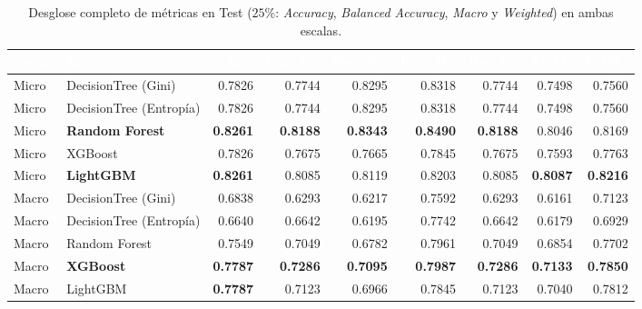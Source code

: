\documentclass[11pt,a4paper]{article}
\begin{document}
\begin{table}[H]
    \centering
    \caption{Desglose completo de métricas en Test ($25\%$: \textit{Accuracy}, \textit{Balanced Accuracy}, \textit{Macro} y \textit{Weighted}) en ambas escalas.}
    \label{tab:detallada_global}
    \setlength{\tabcolsep}{4pt}
    \footnotesize
    \begin{adjustbox}{max width=\textwidth}
    \begin{tabular}{llrrrrrrr}
        \toprule
        \rowcolor{verdeHeader}
        \textcolor{white}{\textbf{Escala}} & \textcolor{white}{\textbf{Modelo}} & \textcolor{white}{\textbf{Acc.}} & \textcolor{white}{\textbf{Bal. Acc}} & \textcolor{white}{\textbf{Prec(M)}} & \textcolor{white}{\textbf{Prec(W)}} & \textcolor{white}{\textbf{Rec(M)}} & \textcolor{white}{\textbf{F1(M)}} & \textcolor{white}{\textbf{F1(W)}} \\
        \midrule
        Micro & DecisionTree (Gini) & 0.7826 & 0.7744 & 0.8295 & 0.8318 & 0.7744 & 0.7498 & 0.7560 \\
        \rowcolor{verdeSuave!50}
        Micro & DecisionTree (Entropía) & 0.7826 & 0.7744 & 0.8295 & 0.8318 & 0.7744 & 0.7498 & 0.7560 \\
        Micro & \textbf{Random Forest} & \textbf{0.8261} & \textbf{0.8188} & \textbf{0.8343} & \textbf{0.8490} & \textbf{0.8188} & 0.8046 & 0.8169 \\
        \rowcolor{verdeSuave!50}
        Micro & XGBoost & 0.7826 & 0.7675 & 0.7665 & 0.7845 & 0.7675 & 0.7593 & 0.7763 \\
        Micro & \textbf{LightGBM} & \textbf{0.8261} & 0.8085 & 0.8119 & 0.8203 & 0.8085 & \textbf{0.8087} & \textbf{0.8216} \\
        \midrule
        \rowcolor{verdeSuave!50}
        Macro & DecisionTree (Gini) & 0.6838 & 0.6293 & 0.6217 & 0.7592 & 0.6293 & 0.6161 & 0.7123 \\
        Macro & DecisionTree (Entropía) & 0.6640 & 0.6642 & 0.6195 & 0.7742 & 0.6642 & 0.6179 & 0.6929 \\
        \rowcolor{verdeSuave!50}
        Macro & Random Forest & 0.7549 & 0.7049 & 0.6782 & 0.7961 & 0.7049 & 0.6854 & 0.7702 \\
        Macro & \textbf{XGBoost} & \textbf{0.7787} & \textbf{0.7286} & \textbf{0.7095} & \textbf{0.7987} & \textbf{0.7286} & \textbf{0.7133} & \textbf{0.7850} \\
        \rowcolor{verdeSuave!50}
        Macro & LightGBM & \textbf{0.7787} & 0.7123 & 0.6966 & 0.7845 & 0.7123 & 0.7040 & 0.7812 \\
        \bottomrule
    \end{tabular}
    \end{adjustbox}
\end{table}
\end{document}
